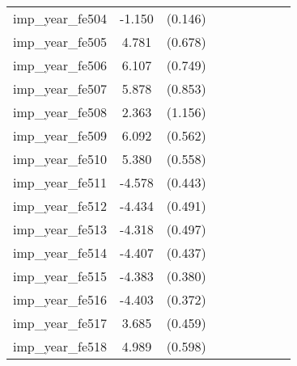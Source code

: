 {\begin{tabular}{l*{4}{cc}}
imp\_year\_fe504&   -1.150\sym{***}&  (0.146)&                  &         &                  &         &                  &         \\
imp\_year\_fe505&    4.781\sym{***}&  (0.678)&                  &         &                  &         &                  &         \\
imp\_year\_fe506&    6.107\sym{***}&  (0.749)&                  &         &                  &         &                  &         \\
imp\_year\_fe507&    5.878\sym{***}&  (0.853)&                  &         &                  &         &                  &         \\
imp\_year\_fe508&    2.363\sym{*}  &  (1.156)&                  &         &                  &         &                  &         \\
imp\_year\_fe509&    6.092\sym{***}&  (0.562)&                  &         &                  &         &                  &         \\
imp\_year\_fe510&    5.380\sym{***}&  (0.558)&                  &         &                  &         &                  &         \\
imp\_year\_fe511&   -4.578\sym{***}&  (0.443)&                  &         &                  &         &                  &         \\
imp\_year\_fe512&   -4.434\sym{***}&  (0.491)&                  &         &                  &         &                  &         \\
imp\_year\_fe513&   -4.318\sym{***}&  (0.497)&                  &         &                  &         &                  &         \\
imp\_year\_fe514&   -4.407\sym{***}&  (0.437)&                  &         &                  &         &                  &         \\
imp\_year\_fe515&   -4.383\sym{***}&  (0.380)&                  &         &                  &         &                  &         \\
imp\_year\_fe516&   -4.403\sym{***}&  (0.372)&                  &         &                  &         &                  &         \\
imp\_year\_fe517&    3.685\sym{***}&  (0.459)&                  &         &                  &         &                  &         \\
imp\_year\_fe518&    4.989\sym{***}&  (0.598)&                  &         &                  &         &                  &         \\

\end{tabular}}
